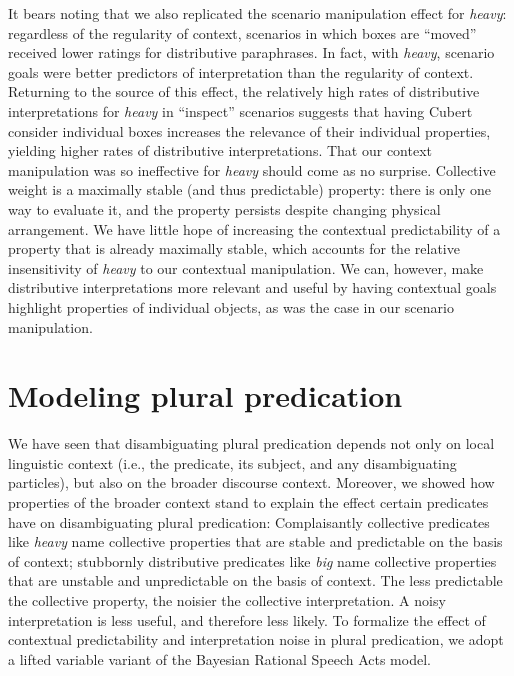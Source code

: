 \documentclass[linguex]{sp}
\begin{document}
It bears noting that we also replicated the scenario manipulation effect for \emph{heavy}: regardless of the regularity of context, scenarios in which boxes are ``moved'' received lower ratings for distributive paraphrases. In fact, with \emph{heavy}, scenario goals were better predictors of interpretation than the regularity of context. Returning to the source of this effect, the relatively high rates of distributive interpretations for \emph{heavy} in ``inspect'' scenarios suggests that having Cubert consider individual boxes increases the relevance of their individual properties, yielding higher rates of distributive interpretations. That our context manipulation was so ineffective for \textit{heavy} should come as no surprise. Collective weight is a maximally stable (and thus predictable) property: there is only one way to evaluate it, and the property persists despite changing physical arrangement. We have little hope of increasing the contextual predictability of a property that is already maximally stable, which accounts for the relative insensitivity of \emph{heavy} to our contextual manipulation. We can, however, make distributive interpretations more relevant and useful by having contextual goals highlight properties of individual objects, as was the case in our scenario manipulation.


\section{Modeling plural predication}

We have seen that disambiguating plural predication depends not only on local linguistic context (i.e., the predicate, its subject, and any disambiguating particles), but also on the broader discourse context. Moreover, we showed how properties of the broader context stand to explain the effect certain predicates have on disambiguating plural predication: Complaisantly collective predicates like \emph{heavy} name collective properties that are stable and predictable on the basis of context; stubbornly distributive predicates like \emph{big} name collective properties that are unstable and unpredictable on the basis of context. The less predictable the collective property, the noisier the collective interpretation. A noisy interpretation is less useful, and therefore less likely. To formalize the effect of contextual predictability and interpretation noise in plural predication, we adopt a lifted variable variant of the Bayesian Rational Speech Acts model.
\end{document}
